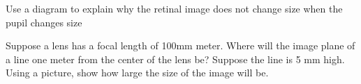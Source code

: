 \item  Use a diagram to explain why the retinal image does not change
size when the pupil changes size

\item  Suppose a lens has a focal length of 100mm meter.
Where will the image plane of a line one meter from the
center of the lens be?
Suppose the line is 5 mm high.
Using a picture, show how large the size of the image
will be.
